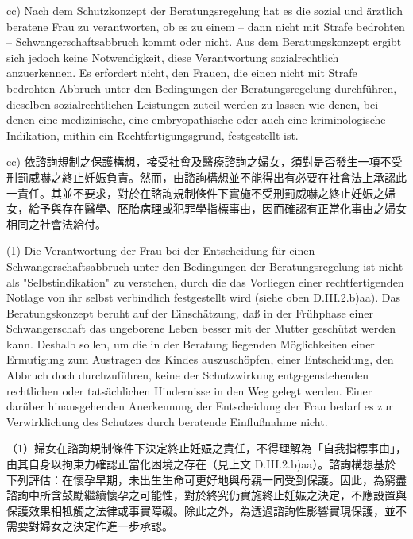 \documentclass[12pt]{article}
\begin{document}
\begin{sourcepara}[title={原文E.210}]
cc) Nach dem Schutzkonzept der Beratungsregelung hat es die sozial und ärztlich beratene Frau zu verantworten, ob es zu einem -- dann nicht mit Strafe bedrohten -- Schwangerschaftsabbruch kommt oder nicht. Aus dem Beratungskonzept ergibt sich jedoch keine Notwendigkeit, diese Verantwortung sozialrechtlich anzuerkennen. Es erfordert nicht, den Frauen, die einen nicht mit Strafe bedrohten Abbruch unter den Bedingungen der Beratungsregelung durchführen, dieselben sozialrechtlichen Leistungen zuteil werden zu lassen wie denen, bei denen eine medizinische, eine embryopathische oder auch eine kriminologische Indikation, mithin ein Rechtfertigungsgrund, festgestellt ist.
\end{sourcepara}
\begin{transpara}
cc) 依諮詢規制之保護構想，接受社會及醫療諮詢之婦女，須對是否發生一項不受刑罰威嚇之終止妊娠負責。然而，由諮詢構想並不能得出有必要在社會法上承認此一責任。其並不要求，對於在諮詢規制條件下實施不受刑罰威嚇之終止妊娠之婦女，給予與存在醫學、胚胎病理或犯罪學指標事由，因而確認有正當化事由之婦女相同之社會法給付。
\end{transpara}

\begin{sourcepara}[title={原文E.211}]
(1) Die Verantwortung der Frau bei der Entscheidung für einen Schwangerschaftsabbruch unter den Bedingungen der Beratungsregelung ist nicht als "Selbstindikation" zu verstehen, durch die das Vorliegen einer rechtfertigenden Notlage von ihr selbst verbindlich festgestellt wird (siehe oben D.III.2.b)aa). Das Beratungskonzept beruht auf der Einschätzung, daß in der Frühphase einer Schwangerschaft das ungeborene Leben besser mit der Mutter geschützt werden kann. Deshalb sollen, um die in der Beratung liegenden Möglichkeiten einer Ermutigung zum Austragen des Kindes auszuschöpfen, einer Entscheidung, den Abbruch doch durchzuführen, keine der Schutzwirkung entgegenstehenden rechtlichen oder tatsächlichen Hindernisse in den Weg gelegt werden. Einer darüber hinausgehenden Anerkennung der Entscheidung der Frau bedarf es zur Verwirklichung des Schutzes durch beratende Einflußnahme nicht.
\end{sourcepara}
\begin{transpara}
（1）婦女在諮詢規制條件下決定終止妊娠之責任，不得理解為「自我指標事由」，由其自身以拘束力確認正當化困境之存在（見上文 D.III.2.b)aa）。諮詢構想基於下列評估：在懷孕早期，未出生生命可更好地與母親一同受到保護。因此，為窮盡諮詢中所含鼓勵繼續懷孕之可能性，對於終究仍實施終止妊娠之決定，不應設置與保護效果相牴觸之法律或事實障礙。除此之外，為透過諮詢性影響實現保護，並不需要對婦女之決定作進一步承認。
\end{transpara}
\end{document}
